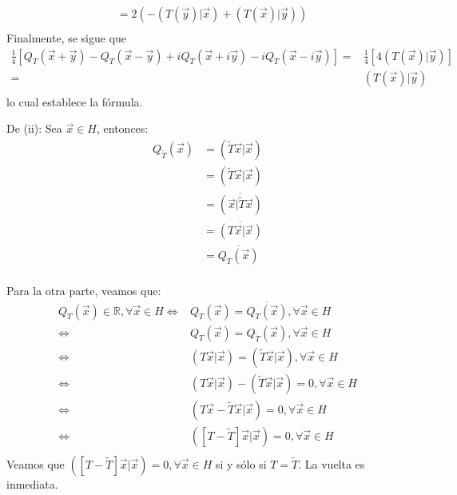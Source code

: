 \documentclass[12pt]{report}
\theoremstyle{largebreak}
\newcommand\adj[1]{\ensuremath{\widetilde{#1}}}
\newcommand\pint[2]{\ensuremath{\left(#1\big|#2\right)}}
\newcommand\conj[1]{\ensuremath{\overline{#1}}}
\begin{document}
\begin{sol}
\begin{equation*}
\begin{split}
                &=2\left(-\pint{T(\vec{y})}{\vec{x}}+\pint{T(\vec{x})}{\vec{y}}\right)\\
            \end{split}
        \end{equation*}
        Finalmente, se sigue que
        \begin{equation*}
            \begin{split}
                \frac{1}{4}\left[Q_T(\vec{x}+\vec{y})-Q_T(\vec{x}-\vec{y})+iQ_T(\vec{x}+i\vec{y})-iQ_T(\vec{x}-i\vec{y})\right]=&\frac{1}{4}\left[4\pint{T(\vec{x})}{\vec{y}}\right] \\
                =&\pint{T(\vec{x})}{\vec{y}}\\
            \end{split}
        \end{equation*}
        lo cual establece la fórmula.

        De (ii): Sea $\vec{x}\in H$, entonces:
        \begin{equation*}
            \begin{split}
                Q_{\adj{T}}(\vec{x})&=\pint{\adj{T}\vec{x}}{\vec{x}}\\
                &=\pint{\adj{T}\vec{x}}{\vec{x}}\\
                &=\conj{\pint{\vec{x}}{\adj{T}\vec{x}}}\\
                &=\conj{\pint{T\vec{x}}{\vec{x}}}\\
                &=\conj{Q_T(\vec{x})}\\
            \end{split}
        \end{equation*}

        Para la otra parte, veamos que:
        \begin{equation*}
            \begin{split}
                Q_T(\vec{x})\in\mathbb{R},\forall\vec{x}\in H\iff&Q_T(\vec{x})=\conj{Q_T(\vec{x})},\forall\vec{x}\in H\\
                \iff&Q_T(\vec{x})=Q_{\adj{T}}(\vec{x}),\forall\vec{x}\in H\\
                \iff&\pint{T\vec{x}}{\vec{x}}=\pint{\adj{T}\vec{x}}{\vec{x}},\forall\vec{x}\in H\\
                \iff&\pint{T\vec{x}}{\vec{x}}-\pint{\adj{T}\vec{x}}{\vec{x}}=0,\forall\vec{x}\in H\\
                \iff&\pint{T\vec{x}-\adj{T}\vec{x}}{\vec{x}}=0,\forall\vec{x}\in H\\
                \iff&\pint{\left[T-\adj{T}\right]\vec{x}}{\vec{x}}=0,\forall\vec{x}\in H\\
            \end{split}
        \end{equation*}
        Veamos que $\pint{\left[T-\adj{T}\right]\vec{x}}{\vec{x}}=0,\forall\vec{x}\in H$ si y sólo si $T=\adj{T}$. La vuelta es inmediata.


    \end{sol}
\end{document}
